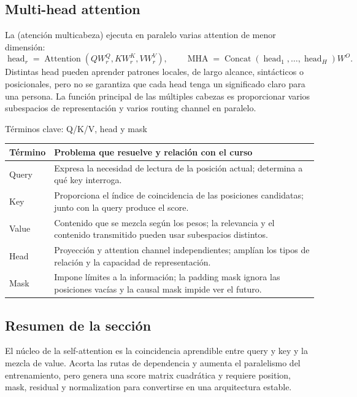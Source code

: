 \subsection{Multi-head attention}

La  (atención multicabeza) ejecuta en paralelo varias attention de menor dimensión:
\[
\operatorname{head}_r=\operatorname{Attention}(QW_r^Q,KW_r^K,VW_r^V),
\qquad
\operatorname{MHA}=\operatorname{Concat}(\operatorname{head}_1,\ldots,\operatorname{head}_H)W^O.
\]
Distintas head pueden aprender patrones locales, de largo alcance, sintácticos o posicionales, pero no se garantiza que cada head tenga un significado claro para una persona. La función principal de las múltiples cabezas es proporcionar varios subespacios de representación y varios routing channel en paralelo.

\begin{knowledgebox}{Términos clave: Q/K/V, head y mask}
\begin{tabularx}{\textwidth}{L{0.18\textwidth} X}
\toprule
Término & Problema que resuelve y relación con el curso \\
\midrule
Query & Expresa la necesidad de lectura de la posición actual; determina a qué key interroga. \\
Key & Proporciona el índice de coincidencia de las posiciones candidatas; junto con la query produce el score. \\
Value & Contenido que se mezcla según los pesos; la relevancia y el contenido transmitido pueden usar subespacios distintos. \\
Head & Proyección y attention channel independientes; amplían los tipos de relación y la capacidad de representación. \\
Mask & Impone límites a la información; la padding mask ignora las posiciones vacías y la causal mask impide ver el futuro. \\
\bottomrule
\end{tabularx}
\end{knowledgebox}

\subsection{Resumen de la sección}

El núcleo de la self-attention es la coincidencia aprendible entre query y key y la mezcla de value. Acorta las rutas de dependencia y aumenta el paralelismo del entrenamiento, pero genera una score matrix cuadrática y requiere position, mask, residual y normalization para convertirse en una arquitectura estable.
